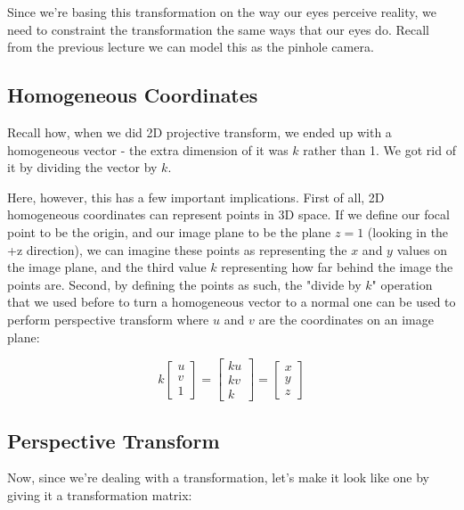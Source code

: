 \documentclass{article}
\begin{document}
Since we're basing this transformation on the way our eyes perceive reality, we need to constraint the transformation the same ways that our eyes do. Recall from the previous lecture we can model this as the pinhole camera.

\subsection{Homogeneous Coordinates}
Recall how, when we did 2D projective transform, we ended up with a homogeneous vector - the extra dimension of it was $k$ rather than 1. We got rid of it by dividing the vector by $k$.

Here, however, this has a few important implications. First of all, 2D homogeneous coordinates can represent points in 3D space. If we define our focal point to be the origin, and our image plane to be the plane $z=1$ (looking in the +z direction), we can imagine these points as representing the $x$ and $y$ values on the image plane, and the third value $k$ representing how far behind the image the points are. Second, by defining the points as such, the "divide by $k$" operation that we used before to turn a homogeneous vector to a normal one can be used to perform perspective transform where $u$ and $v$ are the coordinates on an image plane:

\[
k \left[ \begin{array} { c } { u } \\ { v } \\ { 1 } \end{array} \right] = 
\left[ \begin{array} { c } { ku } \\ { kv } \\ { k } \end{array} \right] = 
\left[ \begin{array} { c } { x } \\ { y } \\ { z } \end{array} \right]
\]

\subsection{Perspective Transform}
Now, since we're dealing with a transformation, let's make it look like one by giving it a transformation matrix:
\end{document}
